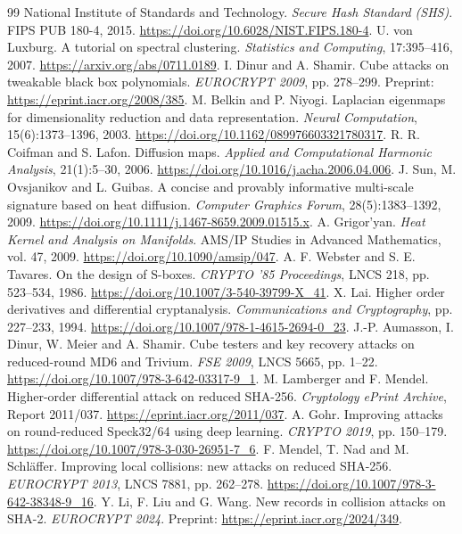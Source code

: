 \documentclass[11pt]{article}
\begin{document}
\begin{thebibliography}{99}
 National Institute of Standards and Technology. \emph{Secure Hash Standard (SHS)}. FIPS PUB 180-4, 2015. \url{https://doi.org/10.6028/NIST.FIPS.180-4}.
 U. von Luxburg. A tutorial on spectral clustering. \emph{Statistics and Computing}, 17:395--416, 2007. \url{https://arxiv.org/abs/0711.0189}.
 I. Dinur and A. Shamir. Cube attacks on tweakable black box polynomials. \emph{EUROCRYPT 2009}, pp. 278--299. Preprint: \url{https://eprint.iacr.org/2008/385}.
 M. Belkin and P. Niyogi. Laplacian eigenmaps for dimensionality reduction and data representation. \emph{Neural Computation}, 15(6):1373--1396, 2003. \url{https://doi.org/10.1162/089976603321780317}.
 R. R. Coifman and S. Lafon. Diffusion maps. \emph{Applied and Computational Harmonic Analysis}, 21(1):5--30, 2006. \url{https://doi.org/10.1016/j.acha.2006.04.006}.
 J. Sun, M. Ovsjanikov and L. Guibas. A concise and provably informative multi-scale signature based on heat diffusion. \emph{Computer Graphics Forum}, 28(5):1383--1392, 2009. \url{https://doi.org/10.1111/j.1467-8659.2009.01515.x}.
 A. Grigor'yan. \emph{Heat Kernel and Analysis on Manifolds}. AMS/IP Studies in Advanced Mathematics, vol. 47, 2009. \url{https://doi.org/10.1090/amsip/047}.
 A. F. Webster and S. E. Tavares. On the design of S-boxes. \emph{CRYPTO '85 Proceedings}, LNCS 218, pp. 523--534, 1986. \url{https://doi.org/10.1007/3-540-39799-X_41}.
 X. Lai. Higher order derivatives and differential cryptanalysis. \emph{Communications and Cryptography}, pp. 227--233, 1994. \url{https://doi.org/10.1007/978-1-4615-2694-0_23}.
 J.-P. Aumasson, I. Dinur, W. Meier and A. Shamir. Cube testers and key recovery attacks on reduced-round MD6 and Trivium. \emph{FSE 2009}, LNCS 5665, pp. 1--22. \url{https://doi.org/10.1007/978-3-642-03317-9_1}.
 M. Lamberger and F. Mendel. Higher-order differential attack on reduced SHA-256. \emph{Cryptology ePrint Archive}, Report 2011/037. \url{https://eprint.iacr.org/2011/037}.
 A. Gohr. Improving attacks on round-reduced Speck32/64 using deep learning. \emph{CRYPTO 2019}, pp. 150--179. \url{https://doi.org/10.1007/978-3-030-26951-7_6}.
 F. Mendel, T. Nad and M. Schl\"affer. Improving local collisions: new attacks on reduced SHA-256. \emph{EUROCRYPT 2013}, LNCS 7881, pp. 262--278. \url{https://doi.org/10.1007/978-3-642-38348-9_16}.
 Y. Li, F. Liu and G. Wang. New records in collision attacks on SHA-2. \emph{EUROCRYPT 2024}. Preprint: \url{https://eprint.iacr.org/2024/349}.

\end{thebibliography}
\end{document}
